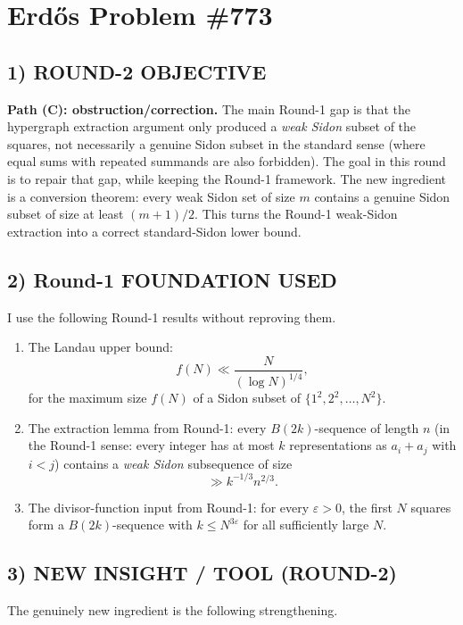 \section{Erd\H{o}s Problem \#773}

\subsection*{1) ROUND-2 OBJECTIVE}
\textbf{Path (C): obstruction/correction.} The main Round-1 gap is that the hypergraph extraction argument only produced a \emph{weak Sidon} subset of the squares, not necessarily a genuine Sidon subset in the standard sense (where equal sums with repeated summands are also forbidden). The goal in this round is to repair that gap, while keeping the Round-1 framework. The new ingredient is a conversion theorem: every weak Sidon set of size $m$ contains a genuine Sidon subset of size at least $(m+1)/2$. This turns the Round-1 weak-Sidon extraction into a correct standard-Sidon lower bound.

\subsection*{2) Round-1 FOUNDATION USED}
I use the following Round-1 results without reproving them.

\begin{enumerate}
\item The Landau upper bound:
\[
 f(N) \ll \frac{N}{(\log N)^{1/4}},
\]
for the maximum size $f(N)$ of a Sidon subset of $\{1^2,2^2,\dots,N^2\}$.

\item The extraction lemma from Round-1: every $B(2k)$-sequence of length $n$ (in the Round-1 sense: every integer has at most $k$ representations as $a_i+a_j$ with $i<j$) contains a \emph{weak Sidon} subsequence of size
\[
 \gg k^{-1/3} n^{2/3}.
\]

\item The divisor-function input from Round-1: for every $\varepsilon>0$, the first $N$ squares form a $B(2k)$-sequence with $k\le N^{3\varepsilon}$ for all sufficiently large $N$.
\end{enumerate}

\subsection*{3) NEW INSIGHT / TOOL (ROUND-2)}
The genuinely new ingredient is the following strengthening.

